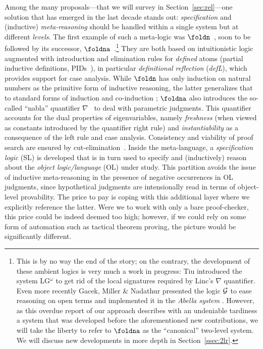 \documentclass[final]{svjour3}
\begin{document}
Among the many proposals---that we will survey in
Section~\ref{sec:rel}---one solution that has emerged in the last
decade stands out: \emph{specification} and (inductive)
\emph{meta-reasoning} should be handled within a single system but at different \emph{levels}. The first
example of such a meta-logic was $\foldn$~\cite{McDowell01}, soon to
be followed by its successor, $\foldna$~\cite{Tiu04phd}.\footnote{This
  is by no way the end of the story; on the contrary, the development
  of these ambient logics is very much a work in progress: Tiu
  \cite{Tiu07} introduced the system LG$^{\omega}$ to get rid of the
  local signatures required by Linc's $\nabla$ quantifier. Even more recently Gacek,
  Miller \& Nadathur presented the logic ${\cal G}$ to ease reasoning
  on open terms and implemented it in the \emph{Abella system}
  \cite{gacek08lics,Abella,AbellaSOS}. However, as this overdue report
  of our approach describes with an undeniable tardiness a system that
  was developed before the aforementioned new contributions,
  we will take the liberty to refer to $\foldna$ as the ``canonical''
  two-level system. We will discuss new developments in more depth in
  Section~\ref{ssec:2lr}.}  They are both based on intuitionistic logic augmented with introduction and elimination rules
for \emph{defined} atoms (partial inductive definitions,
PIDs~\cite{Halnass91}), in particular \emph{definitional reflection}
(\emph{defL}), which provides support for case analysis. While
$\foldn$ has only induction on natural numbers as the primitive form
of inductive reasoning, the latter generalizes that to standard forms
of induction and co-induction \cite{MomiglianoT03}; $\foldna$ also
introduces the so-called ``nabla'' quantifier
$\nabla$~\cite{miller05tocl} to deal with parametric judgments.  This
quantifier accounts for the dual properties of eigenvariables, namely
\emph{freshness} (when viewed as constants introduced by the
quantifier right rule) and \emph{instantiability} as a consequence of
the left rule and case analysis. Consistency and viability of proof search are ensured by
cut-elimination~\cite{mcdowell00tcs,Tiu04phd}. Inside the
meta-language, a \emph{specification logic} (SL) is developed that is
in turn used to specify and (inductively) reason about the
\emph{object logic/language} (OL) under study.
This partition avoids the issue of inductive meta-reasoning in
the presence of negative occurrences in OL judgments, since
hypothetical judgments are intensionally read in terms of object-level
provability. The price to pay is coping with this additional layer where we
explicitly reference the latter.  Were we to work with only a bare
proof-checker, this price could be indeed deemed too high; however, if
we could rely on some form of automation such as tactical theorem
proving, the picture would be significantly different.
\end{document}
